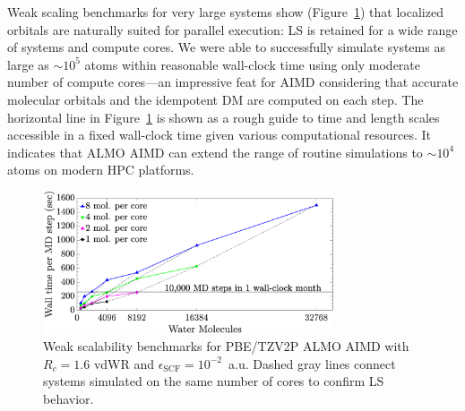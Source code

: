 \documentclass[aip,jcp,reprint,amsmath,amssymb]{revtex4-1}
\begin{document}

Weak scaling benchmarks for very large systems show (Figure~\ref{fig:weakscaling}) that localized orbitals are naturally suited for parallel execution: LS is retained for a wide range of systems and compute cores. 
We were able to successfully simulate systems as large as $\sim10^{5}$ atoms 
within reasonable wall-clock time using only moderate number of compute cores---an impressive feat for AIMD considering that accurate molecular orbitals and the idempotent DM are computed on each step.
The horizontal line in Figure~\ref{fig:weakscaling} is shown as a rough guide to time and length scales accessible in a fixed wall-clock time given various computational resources. It indicates that ALMO AIMD can extend the range of routine simulations to $\sim10^4$ atoms on modern HPC platforms. 



\begin{figure}
\includegraphics[trim={1.6cm 0.8cm 4.7cm 0cm},clip,width=8.6cm]{4.eps}
\caption{\label{fig:weakscaling} Weak scalability benchmarks for PBE/TZV2P ALMO AIMD with  $R_{c} = 1.6$ vdWR and $\epsilon_{\text{SCF}} = 10^{-2}$~a.u. 
Dashed gray lines connect systems simulated on the same number of cores to confirm LS behavior. %
}
\end{figure}

\end{document}
